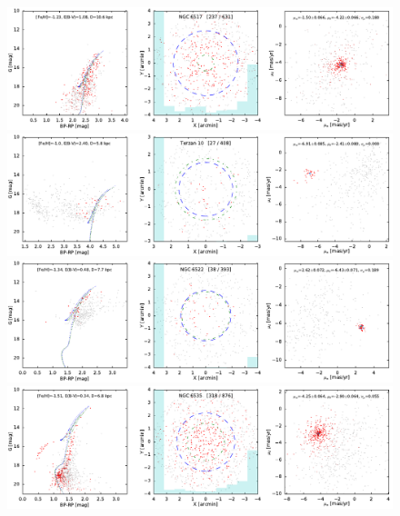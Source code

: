 \documentclass[usenatbib]{mnras}
\begin{document}
\clearpage\begin{figure}
\contcaption{}
\includegraphics{figs/NGC_6517.pdf}
\includegraphics{figs/Terzan_10.pdf}
\includegraphics{figs/NGC_6522.pdf}
\includegraphics{figs/NGC_6535.pdf}
\end{figure}
\end{document}
